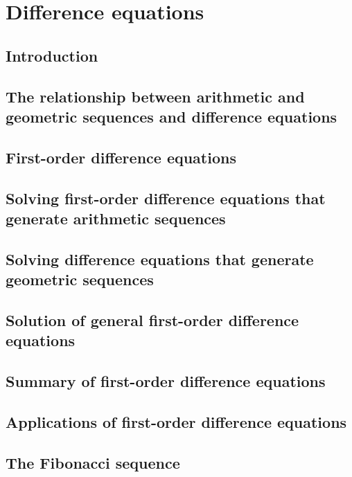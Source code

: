 \documentclass[a4paper,11pt]{article}
\begin{document}
\newpage

\section{Difference equations}
\begin{outline}

\0
\subsection{Introduction}

\0
\subsection{The relationship between arithmetic and geometric sequences and difference equations}

\0
\subsection{First-order difference equations}

\0
\subsection{Solving first-order difference equations that generate arithmetic sequences}

\0
\subsection{Solving difference equations that generate geometric sequences}

\0
\subsection{Solution of general first-order difference equations}

\0
\subsection{Summary of first-order difference equations}

\0
\subsection{Applications of first-order difference equations}

\0
\subsection{The Fibonacci sequence}

\end{outline}
\end{document}
